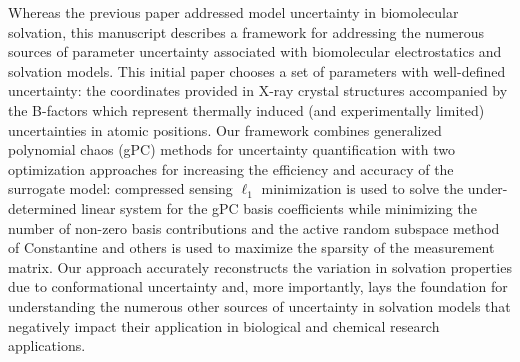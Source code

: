 \documentclass[11pt]{amsart}
\begin{document}
Whereas the previous paper addressed model uncertainty in biomolecular solvation, this manuscript describes a framework for addressing the numerous sources of parameter uncertainty associated with biomolecular electrostatics and solvation models.
This initial paper chooses a set of parameters with well-defined uncertainty:  the coordinates provided in X-ray crystal structures accompanied by the B-factors which represent thermally induced (and experimentally limited) uncertainties in atomic positions.
Our framework combines generalized polynomial chaos (gPC) methods for uncertainty quantification with two optimization approaches for increasing the efficiency and accuracy of the surrogate model: compressed sensing $\ell_1$ minimization is used to solve the under-determined linear system for the gPC basis coefficients while minimizing the number of non-zero basis contributions and the active random subspace method of Constantine and others is used to maximize the sparsity of the measurement matrix.
Our approach accurately reconstructs the variation in solvation properties due to conformational uncertainty and, more importantly, lays the foundation for understanding the numerous other sources of uncertainty in solvation models that negatively impact their application in biological and chemical research applications.

\renewcommand*{\bibfont}{\small}
\printbibliography[title={References}]
\end{document}
